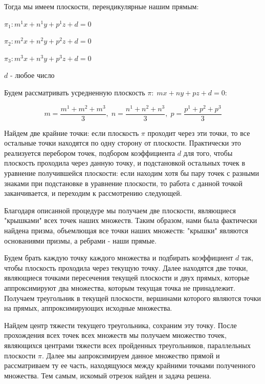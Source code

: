 \documentclass[article,final,14pt]{scrreprt}
\begin{document}
Тогда мы имеем плоскости, перендикулярные нашим прямым:

\begin{center}
	$\mathit{\pi_1}: m^1 x + n^1 y + p^1 z + d = 0$

	\vspace{0.3cm}
	$\mathit{\pi_2}: m^2 x + n^2 y + p^2 z + d = 0$

	\vspace{0.3cm}
	$\mathit{\pi_3}: m^3 x + n^3 y + p^3 z + d = 0$

	\vspace{0.3cm}
	$d$ - любое число
\end{center}

Будем рассматривать усредненную плоскость $\mathit{\pi}: \; m x + n y + p z + d = 0$:

$$m = \frac{m^1+m^2+m^3}{3}, \; n = \frac{n^1+n^2+n^3}{3}, \; p = \frac{p^1+p^2+p^3}{3}$$

\begin{conseq}\label{conseq1}
	Найдем две крайние точки: если плоскость $\pi$ проходит через эти точки, то все остальные точки находятся по одну сторону от плоскости. Практически это реализуется перебором точек, подбором коэффициента $d$ для того, чтобы плоскость проходила через данную точку, и подстановкой остальных точек в уравнение получившейся плоскости: если находим хотя бы пару точек с разными знаками при подстановке в уравнение плоскости, то работа с данной точкой заканчивается, и переходим к рассмотрению следующей.

	Благодаря описанной процедуре мы получаем две плоскости, являющиеся "крышками"  всех точек наших множеств. Таким образом, нами была фактически найдена призма, объемлющая все точки наших множеств: "крышки" являются основаниями призмы, а ребрами - наши прямые.
\end{conseq}

Будем брать каждую точку каждого множества и подбирать коэффициент $d$ так, чтобы плоскость проходила через текущую точку. Далее находятся две точки, являющиеся точками пересечения текущей плоскости и двух прямых, которые аппроксимируют два множества, которым текущая точка не принадлежит. Получаем треугольник в текущей плоскости, вершинами которого являются точки на прямых, аппроксимирующих исходные множества.

\vspace{0.3cm}
Найдем центр тяжести текущего треугольника, сохраним эту точку. После прохождения всех точек всех множеств мы получаем множество точек, являющихся центрами тяжести всех пройденных треугольников, параллельных плоскости $\pi$. Далее мы аапроксимируем данное множество прямой и рассматриваем ту ее часть, находящуюся между крайними точками полученного множества. Тем самым, искомый отрезок найден и задача решена.
\end{document}
